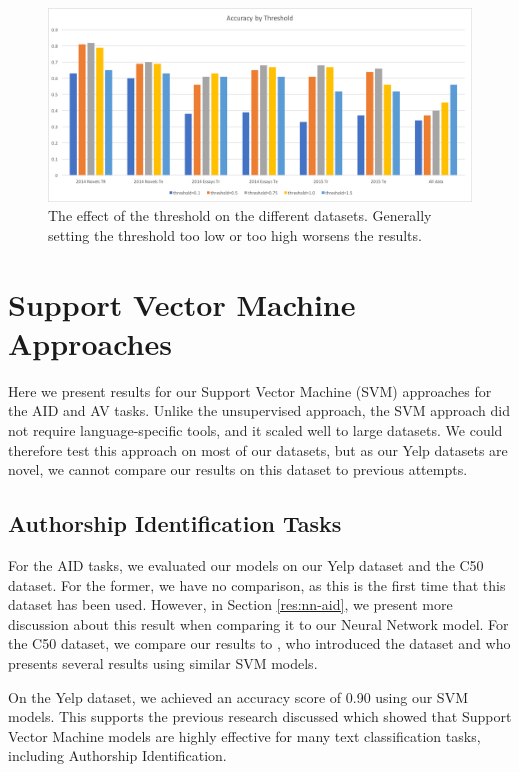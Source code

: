 \begin{figure}[ht]
    \label{fig:unsupthresh}
    \includegraphics[scale=0.5]{unsupervisedthreshold}
    \caption{The effect of the threshold on the different datasets. Generally setting the threshold too low or too high worsens the results.}
\end{figure}


\section{Support Vector Machine Approaches}
Here we present results for our Support Vector Machine (SVM) approaches for the AID and AV tasks. Unlike the unsupervised approach, the SVM approach did not require language-specific tools, and it scaled well to large datasets. We could therefore test this approach on most of our datasets, but as our Yelp datasets are novel, we cannot compare our results on this dataset to previous attempts.

\subsection{Authorship Identification Tasks}
\label{res:svmaid}
For the AID tasks, we evaluated our models on our Yelp dataset and the C50 dataset. For the former, we have no comparison, as this is the first time that this dataset has been used. However, in Section \ref{res:nn-aid}, we present more discussion about this result when comparing it to our Neural Network model. For the C50 dataset, we compare our results to \citet{houvardas2006ngram}, who introduced the dataset and who presents several results using similar SVM models.

On the Yelp dataset, we achieved an accuracy score of 0.90 using our SVM models. This supports the previous research discussed which showed that Support Vector Machine models are highly effective for many text classification tasks, including Authorship Identification. 


